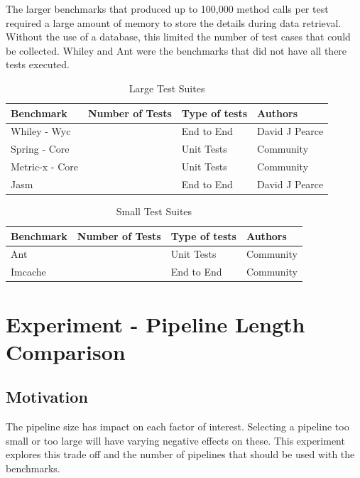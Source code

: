 \documentclass[11pt
              , a4paper
              , twoside
              , openright
              ]{report}
\newcommand{\rom}[1]{\uppercase\expandafter{\romannumeral #1\relax}}
\begin{document}
The larger benchmarks that produced up to 100,000 method calls per test required a large amount of memory to store the details during data retrieval. Without the use of a database, this limited the number of test cases that could be collected. Whiley and Ant were the benchmarks that did not have all there tests executed.  

\begin{table}[]
\centering

\begin{tabular}{|l|l|l|l|}
\hline
{\bf Benchmark}       &  {\bf Number of Tests} & {\bf Type of tests} & {\bf Authors}   \\ \hline
Whiley - Wyc         &       &    End to End      & David J Pearce          \\ \hline
Spring - Core   &       &    Unit Tests      & Community \\ \hline
Metric-x - Core &       &    Unit Tests      & Community \\ \hline
Jasm              &             &    End to End      & David J Pearce \\ \hline

\end{tabular}
\caption{Large Test Suites}
\label{large_test}
\end{table}

\begin{table}[]
\centering
\begin{tabular}{|l|l|l|l|}
\hline
{\bf Benchmark}   & {\bf Number of Tests} & {\bf Type of tests} & {\bf Authors}  \\ \hline
Ant             &       &    Unit Tests      & Community \\ \hline
Imcache &           &    End to End        & Community \\ \hline
\end{tabular}
\label{small_test}
\caption{Small Test Suites}
\end{table}

\section{Experiment \rom{1} - Pipeline Length Comparison}
\label{sec:pipelineEva}

\subsection{Motivation}
The pipeline size has impact on each factor of interest. Selecting a pipeline too small or too large will have varying negative effects on these. This experiment explores this trade off and the number of pipelines that should be used with the benchmarks.
\end{document}
